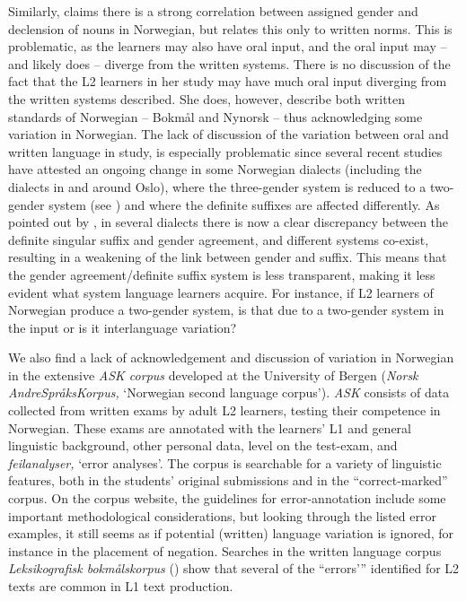 \documentclass[output=paper,colorlinks,citecolor=brown,modfonts,nonflat]{../langscibook}
\begin{document}
Similarly, \citet{Ragnhildstveit2017} claims there is a strong correlation between assigned gender and declension of nouns in Norwegian, but relates this only to written norms. This is problematic, as the learners may also have oral input, and the oral input may – and likely does – diverge from the written systems. There is no discussion of the fact that the L2 learners in her study may have much oral input diverging from the written systems described. She does, however, describe both written standards of Norwegian – Bokmål and Nynorsk – thus acknowledging some variation in Norwegian. The lack of discussion of the variation between oral and written language in  study, is especially problematic since several recent studies have attested an ongoing change in some Norwegian dialects (including the dialects in and around Oslo), where the three-gender system is reduced to a two-gender system (see \citealt{Lødrup2011, RodinaWestergaard2015Germanic,BusterudEtAl2019}) and where the definite suffixes are affected differently. As pointed out by \citet{EmilsenInPreparation}, in several dialects there is now a clear discrepancy between the definite singular suffix and gender agreement, and different systems co-exist, resulting in a weakening of the link between gender and suffix. This means that the gender agreement/definite suffix system is less transparent, making it less evident what system language learners acquire. For instance, if L2 learners of Norwegian produce a two-gender system, is that due to a two-gender system in the input or is it interlanguage variation?

We also find a lack of acknowledgement and discussion of variation in Norwegian in the extensive \textit{ASK corpus} developed at the University of Bergen (\textit{Norsk AndreSpråksKorpus,} ‘Norwegian second language corpus’). \textit{ASK} consists of data collected from written exams by adult L2 learners, testing their competence in Norwegian. These exams are annotated with the learners’ L1 and general linguistic background, other personal data, level on the test-exam, and \textit{feilanalyser,} ‘error analyses’. The corpus is searchable for a variety of linguistic features, both in the students’ original submissions and in the ``correct-marked'' corpus. On the corpus website, the guidelines for error-annotation include some important methodological considerations, but looking through the listed error examples, it still seems as if potential (written) language variation is ignored, for instance in the placement of negation. Searches in the written language corpus \textit{Leksikografisk bokmålskorpus} (\citealt{KnudsenFjeld2013}) show that several of the ``errors’'' identified for L2 texts are common in L1 text production.
\end{document}
